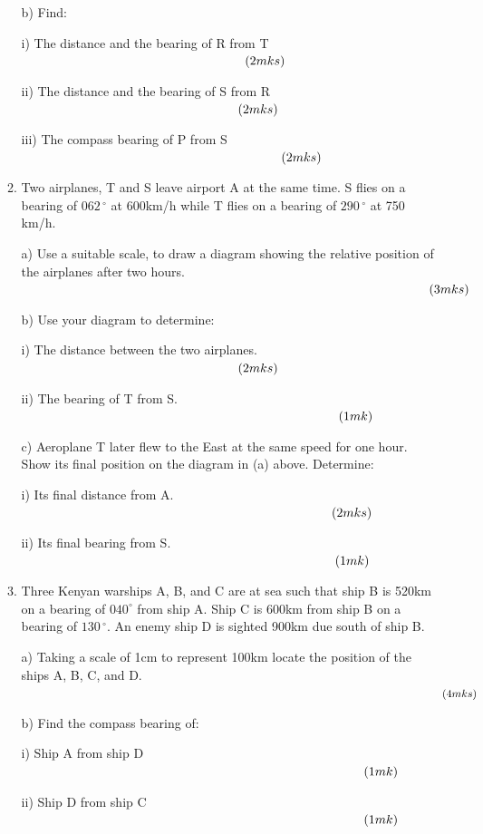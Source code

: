 \documentclass[
  a4paperpaper,
]{scrbook}
\begin{document}
\begin{enumerate}
\begin{tcolorbox}
\begin{enumerate}
    b) Find:

    i) The distance and the bearing of R from T
    \(\hspace{6.2cm} (2mks)\)

    ii) The distance and the bearing of S from R
    \(\hspace{6.0cm} (2mks)\)

    iii) The compass bearing of P from S \(\hspace{7.2cm} (2mks)\)
  \item
    Two airplanes, T and S leave airport A at the same time. S flies on
    a bearing of \(062\,^{\circ}\) at 600km/h while T flies on a bearing
    of \(290\,^{\circ}\) at 750 km/h.

    a) Use a suitable scale, to draw a diagram showing the relative
    position of the airplanes after two hours.
    \(\hspace{11.3cm} (3mks)\)

    b) Use your diagram to determine:

    i) The distance between the two airplanes. \(\hspace{6.0cm} (2mks)\)

    ii) The bearing of T from S. \(\hspace{8.8cm} (1mk)\)

    c) Aeroplane T later flew to the East at the same speed for one
    hour. Show its final position on the diagram in (a) above.
    Determine:

    i) Its final distance from A.\(\hspace{8.6cm} (2mks)\)

    ii) Its final bearing from S. \(\hspace{8.7cm} (1mk)\)
  \item
    Three Kenyan warships A, B, and C are at sea such that ship B is
    520km on a bearing of \(040^{\circ}\) from ship A. Ship C is 600km
    from ship B on a bearing of \(130\,^{\circ}\). An enemy ship D is
    sighted 900km due south of ship B.

    a) Taking a scale of 1cm to represent 100km locate the position of
    the ships A, B, C, and D. \(\hspace{13.5cm} (4mks)\)

    b) Find the compass bearing of:

    i) Ship A from ship D \(\hspace{9.5cm} (1mk)\)

    ii) Ship D from ship C \(\hspace{9.5cm} (1mk)\)


\end{enumerate}
\end{tcolorbox}
\end{enumerate}
\end{document}

